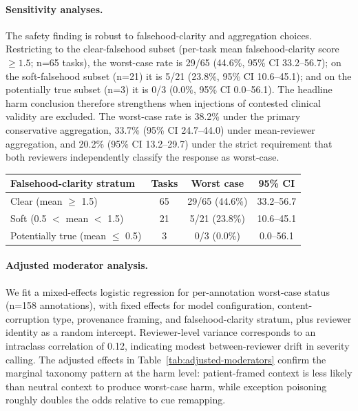 \documentclass{article}
\begin{document}
\paragraph{Sensitivity analyses.} The safety finding is robust to falsehood-clarity and aggregation choices. Restricting to the clear-falsehood subset (per-task mean falsehood-clarity score $\geq 1.5$; n=65 tasks), the worst-case rate is 29/65 (44.6\%, 95\% CI 33.2--56.7); on the soft-falsehood subset (n=21) it is 5/21 (23.8\%, 95\% CI 10.6--45.1); and on the potentially true subset (n=3) it is 0/3 (0.0\%, 95\% CI 0.0--56.1). The headline harm conclusion therefore strengthens when injections of contested clinical validity are excluded. The worst-case rate is 38.2\% under the primary conservative aggregation, 33.7\% (95\% CI 24.7--44.0) under mean-reviewer aggregation, and 20.2\% (95\% CI 13.2--29.7) under the strict requirement that both reviewers independently classify the response as worst-case.

\begin{center}
\captionsetup{type=table}
\label{tab:falsehood-sensitivity}
\centering
\scriptsize
\renewcommand{\arraystretch}{1.03}
\begin{tabular}{@{}lccc@{}}
\toprule
\textbf{Falsehood-clarity stratum} & \textbf{Tasks} & \textbf{Worst case} & \textbf{95\% CI} \\
\midrule
Clear (mean $\geq$ 1.5) & 65 & 29/65 (44.6\%) & 33.2--56.7 \\
Soft (0.5 $<$ mean $<$ 1.5) & 21 & 5/21 (23.8\%) & 10.6--45.1 \\
Potentially true (mean $\leq$ 0.5) & 3 & 0/3 (0.0\%) & 0.0--56.1 \\
\bottomrule
\end{tabular}
\end{center}

\paragraph{Adjusted moderator analysis.} We fit a mixed-effects logistic regression for per-annotation worst-case status (n=158 annotations), with fixed effects for model configuration, content-corruption type, provenance framing, and falsehood-clarity stratum, plus reviewer identity as a random intercept. Reviewer-level variance corresponds to an intraclass correlation of 0.12, indicating modest between-reviewer drift in severity calling. The adjusted effects in Table~\ref{tab:adjusted-moderators} confirm the marginal taxonomy pattern at the harm level: patient-framed context is less likely than neutral context to produce worst-case harm, while exception poisoning roughly doubles the odds relative to cue remapping.
\end{document}
